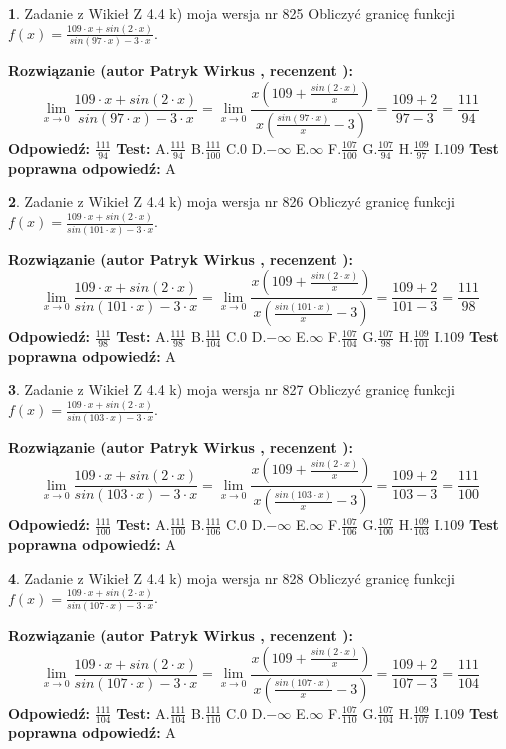 \documentclass[12pt, a4paper]{article}
\theoremstyle{definition} %
\newtheorem{zad}{}
\newcommand{\zadStart}[1]{\begin{zad}#1\newline}
\newcommand{\zadStop}{\end{zad}}
\newcommand{\rozwStart}[2]{\noindent \textbf{Rozwiązanie (autor #1 , recenzent #2): }\newline}
\newcommand{\rozwStop}{\newline}
\newcommand{\odpStart}{\noindent \textbf{Odpowiedź:}\newline}
\newcommand{\odpStop}{\newline}
\newcommand{\testStart}{\noindent \textbf{Test:}\newline}
\newcommand{\testStop}{\newline}
\newcommand{\kluczStart}{\noindent \textbf{Test poprawna odpowiedź:}\newline}
\newcommand{\kluczStop}{\newline}
\begin{document}
\zadStart{Zadanie z Wikieł Z 4.4 k) moja wersja nr 825}
Obliczyć granicę funkcji $f(x)=\frac{109\cdot x +sin(2\cdot x)}{sin(97\cdot x) -3\cdot x}$.
\zadStop
\rozwStart{Patryk Wirkus}{}
$$\lim\limits_{x\to 0}\frac{109\cdot x +sin(2\cdot x)}{sin(97\cdot x) -3\cdot x}
=\lim\limits_{x\to 0}\frac{x(109+\frac{sin(2\cdot x)}{x})}{x(\frac{sin(97\cdot x)}{x}-3)}
=\frac{109+2}{97-3} = \frac{111}{94}$$
\rozwStop
\odpStart
$\frac{111}{94}$
\odpStop
\testStart
A.$\frac{111}{94}$
B.$\frac{111}{100}$
C.$0$
D.$-\infty$
E.$\infty$
F.$\frac{107}{100}$
G.$\frac{107}{94}$
H.$\frac{109}{97}$
I.$109$
\testStop
\kluczStart
A
\kluczStop



\zadStart{Zadanie z Wikieł Z 4.4 k) moja wersja nr 826}
Obliczyć granicę funkcji $f(x)=\frac{109\cdot x +sin(2\cdot x)}{sin(101\cdot x) -3\cdot x}$.
\zadStop
\rozwStart{Patryk Wirkus}{}
$$\lim\limits_{x\to 0}\frac{109\cdot x +sin(2\cdot x)}{sin(101\cdot x) -3\cdot x}
=\lim\limits_{x\to 0}\frac{x(109+\frac{sin(2\cdot x)}{x})}{x(\frac{sin(101\cdot x)}{x}-3)}
=\frac{109+2}{101-3} = \frac{111}{98}$$
\rozwStop
\odpStart
$\frac{111}{98}$
\odpStop
\testStart
A.$\frac{111}{98}$
B.$\frac{111}{104}$
C.$0$
D.$-\infty$
E.$\infty$
F.$\frac{107}{104}$
G.$\frac{107}{98}$
H.$\frac{109}{101}$
I.$109$
\testStop
\kluczStart
A
\kluczStop



\zadStart{Zadanie z Wikieł Z 4.4 k) moja wersja nr 827}
Obliczyć granicę funkcji $f(x)=\frac{109\cdot x +sin(2\cdot x)}{sin(103\cdot x) -3\cdot x}$.
\zadStop
\rozwStart{Patryk Wirkus}{}
$$\lim\limits_{x\to 0}\frac{109\cdot x +sin(2\cdot x)}{sin(103\cdot x) -3\cdot x}
=\lim\limits_{x\to 0}\frac{x(109+\frac{sin(2\cdot x)}{x})}{x(\frac{sin(103\cdot x)}{x}-3)}
=\frac{109+2}{103-3} = \frac{111}{100}$$
\rozwStop
\odpStart
$\frac{111}{100}$
\odpStop
\testStart
A.$\frac{111}{100}$
B.$\frac{111}{106}$
C.$0$
D.$-\infty$
E.$\infty$
F.$\frac{107}{106}$
G.$\frac{107}{100}$
H.$\frac{109}{103}$
I.$109$
\testStop
\kluczStart
A
\kluczStop



\zadStart{Zadanie z Wikieł Z 4.4 k) moja wersja nr 828}
Obliczyć granicę funkcji $f(x)=\frac{109\cdot x +sin(2\cdot x)}{sin(107\cdot x) -3\cdot x}$.
\zadStop
\rozwStart{Patryk Wirkus}{}
$$\lim\limits_{x\to 0}\frac{109\cdot x +sin(2\cdot x)}{sin(107\cdot x) -3\cdot x}
=\lim\limits_{x\to 0}\frac{x(109+\frac{sin(2\cdot x)}{x})}{x(\frac{sin(107\cdot x)}{x}-3)}
=\frac{109+2}{107-3} = \frac{111}{104}$$
\rozwStop
\odpStart
$\frac{111}{104}$
\odpStop
\testStart
A.$\frac{111}{104}$
B.$\frac{111}{110}$
C.$0$
D.$-\infty$
E.$\infty$
F.$\frac{107}{110}$
G.$\frac{107}{104}$
H.$\frac{109}{107}$
I.$109$
\testStop
\kluczStart
A
\kluczStop
\end{document}
